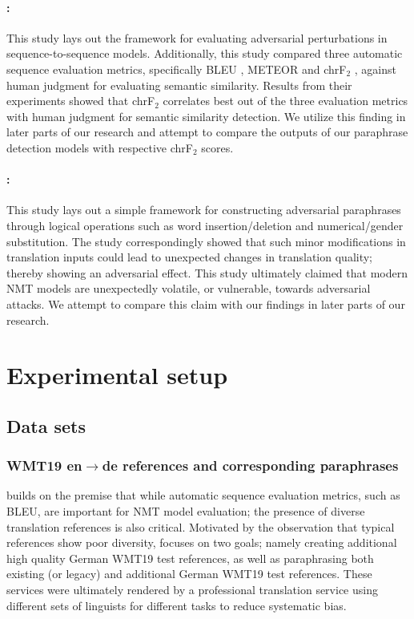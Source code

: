 \documentclass[11pt,a4paper]{article}
\begin{document}
\paragraph{\citet{michel2019evaluation}:} This study lays out the framework for
evaluating adversarial perturbations in sequence-to-sequence models.
Additionally, this study compared three automatic sequence evaluation metrics,
specifically BLEU \cite{papineni2002bleu}, METEOR \cite{denkowski2014meteor} and
chrF$_2$ \cite{popovic2015chrf}, against human judgment for evaluating semantic
similarity. Results from their experiments showed that chrF$_2$ correlates best
out of the three evaluation metrics with human judgment for semantic similarity
detection. We utilize this finding in later parts of our research and attempt to
compare the outputs of our paraphrase detection models with respective chrF$_2$
scores.

\paragraph{\citet{fadaee2020unreasonable}:} This study lays out a simple
framework for constructing adversarial paraphrases through logical operations
such as word insertion/deletion and numerical/gender substitution. The study
correspondingly showed that such minor modifications in translation inputs could
lead to unexpected changes in translation quality; thereby showing an
adversarial effect. This study ultimately claimed that modern NMT models are
unexpectedly volatile, or vulnerable, towards adversarial attacks. We attempt to
compare this claim with our findings in later parts of our research.

\section{Experimental setup}

\subsection{Data sets}

\subsubsection{WMT19 en$\rightarrow$de references and corresponding paraphrases}

\citet{freitag-bleu-paraphrase-references-2020} builds on the premise that while
automatic sequence evaluation metrics, such as BLEU, are important for NMT model
evaluation; the presence of diverse translation references is also critical.
Motivated by the observation that typical references show poor diversity,
\citet{freitag-bleu-paraphrase-references-2020} focuses on two goals; namely
creating additional high quality German WMT19 test references, as well as
paraphrasing both existing (or legacy) and additional German WMT19 test
references. These services were ultimately rendered by a professional
translation service using different sets of linguists for different tasks to
reduce systematic bias.
\end{document}
